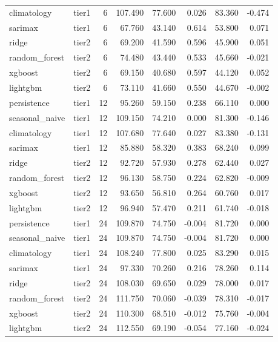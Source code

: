 \begin{table}[htbp]
\begin{tabular}{lrrrrrrr}
climatology & tier1 & 6 & 107.490 & 77.600 & 0.026 & 83.360 & -0.474 \\
sarimax & tier1 & 6 & 67.760 & 43.140 & 0.614 & 53.800 & 0.071 \\
ridge & tier2 & 6 & 69.200 & 41.590 & 0.596 & 45.900 & 0.051 \\
random\_forest & tier2 & 6 & 74.480 & 43.440 & 0.533 & 45.660 & -0.021 \\
xgboost & tier2 & 6 & 69.150 & 40.680 & 0.597 & 44.120 & 0.052 \\
lightgbm & tier2 & 6 & 73.110 & 41.660 & 0.550 & 44.670 & -0.002 \\
persistence & tier1 & 12 & 95.260 & 59.150 & 0.238 & 66.110 & 0.000 \\
seasonal\_naive & tier1 & 12 & 109.150 & 74.210 & 0.000 & 81.300 & -0.146 \\
climatology & tier1 & 12 & 107.680 & 77.640 & 0.027 & 83.380 & -0.131 \\
sarimax & tier1 & 12 & 85.880 & 58.320 & 0.383 & 68.240 & 0.099 \\
ridge & tier2 & 12 & 92.720 & 57.930 & 0.278 & 62.440 & 0.027 \\
random\_forest & tier2 & 12 & 96.130 & 58.750 & 0.224 & 62.820 & -0.009 \\
xgboost & tier2 & 12 & 93.650 & 56.810 & 0.264 & 60.760 & 0.017 \\
lightgbm & tier2 & 12 & 96.940 & 57.470 & 0.211 & 61.740 & -0.018 \\
persistence & tier1 & 24 & 109.870 & 74.750 & -0.004 & 81.720 & 0.000 \\
seasonal\_naive & tier1 & 24 & 109.870 & 74.750 & -0.004 & 81.720 & 0.000 \\
climatology & tier1 & 24 & 108.240 & 77.800 & 0.025 & 83.290 & 0.015 \\
sarimax & tier1 & 24 & 97.330 & 70.260 & 0.216 & 78.260 & 0.114 \\
ridge & tier2 & 24 & 108.030 & 69.650 & 0.029 & 78.000 & 0.017 \\
random\_forest & tier2 & 24 & 111.750 & 70.060 & -0.039 & 78.310 & -0.017 \\
xgboost & tier2 & 24 & 110.300 & 68.510 & -0.012 & 75.760 & -0.004 \\
lightgbm & tier2 & 24 & 112.550 & 69.190 & -0.054 & 77.160 & -0.024 \\
\bottomrule
\end{tabular}
\end{table}
